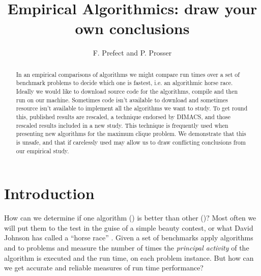 \documentclass[runningheads]{llncs}
\begin{document}
\title{Empirical Algorithmics: draw your own conclusions}
\author{F. Prefect and P. Prosser}
\maketitle

\begin{abstract}
In an empirical comparisons of algorithms we might compare run times over a set of benchmark
problems to decide which one is fastest, i.e. an algorithmic horse race. Ideally we would like to
download source code for the algorithms, compile and then run on our machine. Sometimes code isn't
available to download and sometimes resource isn't available to implement all the algorithms we want
to study. To get round this, published results are rescaled, a technique endorsed by DIMACS, and those rescaled results included in a new study. 
This technique is frequently used when presenting new algorithms for the maximum clique problem.
We demonstrate that this
 is unsafe, and that if carelessly used may allow us
to draw conflicting conclusions from our empirical study.
\end{abstract}

\section{Introduction}
How can we determine if one algorithm () is better than other ()? 
Most often we will put them to the test in the guise of a simple beauty contest, or what
David Johnson has called a ``horse race'' \cite{howTo}. Given a set of benchmarks apply algorithms  and  to problems and measure the 
number of times the \emph{principal activity} of the algorithm is executed and the run time, on each problem instance. 
But how can we get accurate and reliable measures of run time performance?
\end{document}

